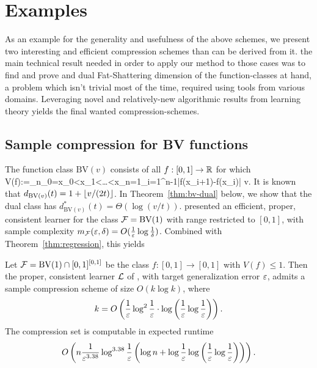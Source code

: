 \chapter{Examples}

As an example for the generality and usefulness of the above schemes, we present two interesting and efficient compression schemes than can be derived from it. the main technical result needed in order to apply our method to those cases was to find and prove and dual Fat-Shattering dimension of the function-classes at hand, a problem which isn't trivial most of the time, required using tools from various domains. Leveraging novel and relatively-new algorithmic results from learning theory yields the final wanted compression-schemes.
    



\section{Sample compression for BV functions}

\label{sec:BV}
\newcommand{\gammat}{t}
The function class $\mathrm{BV}(v)$ consists of all $f:[0,1]\to\mathbb{R}$ for which
\beq
V(f):=\sup_{n\in\N}\sup_{0=x_0<x_1<\ldots<x_n=1}\sum_{i=1}^{n-1}|f(x_{i+1})-f(x_i)| \le v.
\eeq
It is known
\citep[Theorem 11.12]{MR1741038} that $d_{\mathrm{BV}(v)}(t)=1+\left\lfloor v/(2t)\right\rfloor$.
In Theorem~\ref{thm:bv-dual} below, we show that the dual class has
$d^*_{\mathrm{BV}(v)}(t)=\Theta\left(\log(v/t)\right)$.
\citet{DBLP:journals/iandc/Long04} presented an efficient, proper, consistent learner
for the class $\mathcal{F}=\mathrm{BV}(1)$ with range restricted to $[0,1]$,
with sample complexity
$m_{\mathcal{F}}(\varepsilon,\delta)=O(\frac1{\varepsilon}\log\frac1\delta)$.
Combined with Theorem~\ref{thm:regression}, this yields
\begin{corollary}
  Let $\mathcal{F}=\mathrm{BV}(1)\cap[0,1]^{[0,1]}$
  be the class
  $f:[0,1] \to [0,1]$ with $V(f)\le1$.
  Then the proper, consistent learner $\mathcal{L}$
  of \citet{DBLP:journals/iandc/Long04},
  with target generalization error $\varepsilon$,
  admits
  a sample compression scheme of size $O(k\log k)$, where
  \[k = {O}\left( \frac{1}{\varepsilon} \log^2 \frac{1}{\varepsilon} \cdot \log \left(\frac{1}{\varepsilon} \log \frac{1}{\varepsilon}\right)  \right).\]
The compression set is computable in expected runtime
  \[
    {O}\left(  n \frac{1}{\varepsilon^{3.38}} \log^{3.38} \frac{1}{\varepsilon}
      \left(
        \log n + \log \frac{1}{\varepsilon} \log
        \left(
          \frac{1}{\varepsilon} \log \frac{1}{\varepsilon}
        \right)
        \right) \right)
    .
  \]
\end{corollary}


